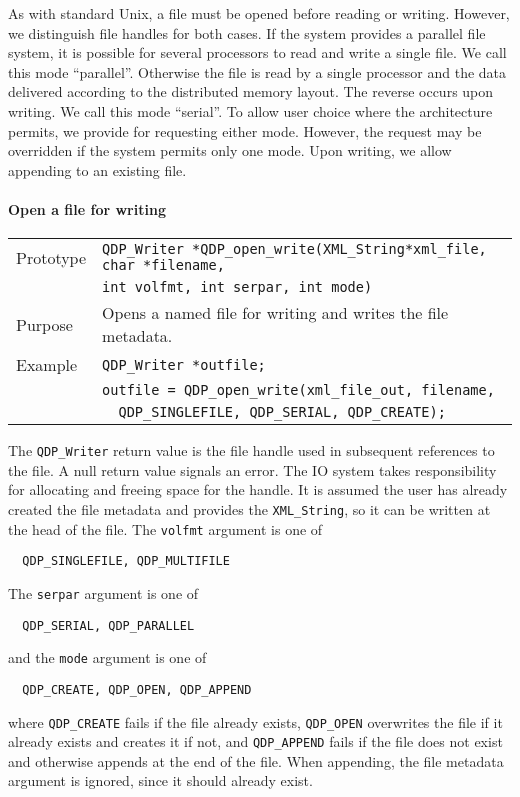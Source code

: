 \documentclass{article}
\newcommand{\QMDhandle}{{\tt XML\_String}}
\begin{document}
As with standard Unix, a file must be opened before reading or
writing.  However, we distinguish file handles for both cases.  If the
system provides a parallel file system, it is possible for several
processors to read and write a single file. We call this mode
``parallel''.  Otherwise the file is read by a single processor and
the data delivered according to the distributed memory layout.  The
reverse occurs upon writing. We call this mode ``serial''. To allow
user choice where the architecture permits, we provide for requesting
either mode.  However, the request may be overridden if the system
permits only one mode.  Upon writing, we allow appending to an
existing file.

\paragraph{Open a file for writing}

\begin{flushleft}
  \begin{tabular}{|l|l|}
  \hline
  Prototype      & \verb|QDP_Writer *QDP_open_write(|\QMDhandle\verb|*xml_file, char *filename,|\\
                 & \verb|int volfmt, int serpar, int mode)|\\
    \hline
  Purpose        & Opens a named file for writing and writes the file metadata. \\
\hline
  Example  & \verb|QDP_Writer *outfile;| \\
           & \verb|outfile = QDP_open_write(xml_file_out, filename, |\\
	   & \verb|  QDP_SINGLEFILE, QDP_SERIAL, QDP_CREATE); |\\
   \hline
 \end{tabular}
\end{flushleft}
%
The \verb|QDP_Writer| return value is the file handle used in
subsequent references to the file.  A null return value signals an
error. The IO system takes responsibility for allocating and freeing
space for the handle.  It is assumed the user has already created the
file metadata and provides the \QMDhandle, so it can be written
at the head of the file.  The \verb|volfmt| argument is one of
%
\begin{verbatim}
  QDP_SINGLEFILE, QDP_MULTIFILE
\end{verbatim}
%
The \verb|serpar| argument is one of
%
\begin{verbatim}
  QDP_SERIAL, QDP_PARALLEL
\end{verbatim}
%
and the \verb|mode| argument is one of
%
\begin{verbatim}
  QDP_CREATE, QDP_OPEN, QDP_APPEND
\end{verbatim}
%
where \verb|QDP_CREATE| fails if the file already exists,
\verb|QDP_OPEN| overwrites the file if it already exists and creates
it if not, and \verb|QDP_APPEND| fails if the file does not exist and
otherwise appends at the end of the file.  When appending, the file
metadata argument is ignored, since it should already exist.
\end{document}
